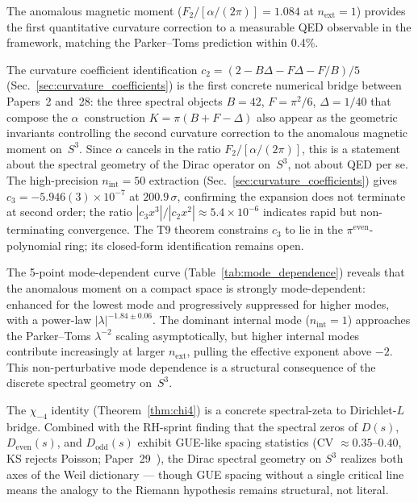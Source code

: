 \documentclass[11pt]{article}
\begin{document}
The anomalous
magnetic moment ($F_2 / [\alpha/(2\pi)] = 1.084$ at
$n_{\mathrm{ext}} = 1$) provides the first quantitative curvature
correction to a measurable QED observable in the framework, matching the
Parker--Toms prediction within 0.4\%.

The curvature coefficient identification
$c_2 = (2 - B\Delta - F\Delta - F/B)/5$
(Sec.~\ref{sec:curvature_coefficients}) is the first concrete
numerical bridge between Papers~2 and~28: the three spectral objects
$B = 42$, $F = \pi^2/6$, $\Delta = 1/40$ that compose the
$\alpha$~construction $K = \pi(B + F - \Delta)$ also appear as the
geometric invariants controlling the second curvature correction to the
anomalous magnetic moment on~$S^3$.  Since $\alpha$ cancels in the ratio
$F_2/[\alpha/(2\pi)]$, this is a statement about the spectral geometry
of the Dirac operator on~$S^3$, not about QED per se.  The high-precision
$n_{\mathrm{int}}=50$ extraction (Sec.~\ref{sec:curvature_coefficients})
gives $c_3 = -5.946(3) \times 10^{-7}$ at $200.9\,\sigma$, confirming the
expansion does not terminate at second order; the ratio
$|c_3 x^3| / |c_2 x^2| \approx 5.4 \times 10^{-6}$ indicates rapid but
non-terminating convergence.  The T9 theorem constrains $c_3$ to lie in
the $\pi^{\mathrm{even}}$-polynomial ring; its closed-form identification
remains open.

The 5-point mode-dependent curve
(Table~\ref{tab:mode_dependence}) reveals that the anomalous moment on
a compact space is strongly mode-dependent: enhanced for the lowest mode
and progressively suppressed for higher modes, with a power-law
$|\lambda|^{-1.84 \pm 0.06}$.  The dominant internal mode ($n_{\mathrm{int}} = 1$)
approaches the Parker--Toms $\lambda^{-2}$ scaling asymptotically, but
higher internal modes contribute increasingly at larger $n_{\mathrm{ext}}$,
pulling the effective exponent above $-2$.  This non-perturbative mode
dependence is a structural consequence of the discrete spectral
geometry on~$S^3$.

The $\chi_{-4}$ identity (Theorem~\ref{thm:chi4}) is a concrete
spectral-zeta to Dirichlet-$L$ bridge.  Combined with the RH-sprint
finding that the spectral zeros of $D(s)$, $D_{\mathrm{even}}(s)$, and
$D_{\mathrm{odd}}(s)$ exhibit GUE-like spacing statistics (CV $\approx
0.35$--$0.40$, KS rejects Poisson; Paper~29~\cite{paper29}), the
Dirac spectral geometry on $S^3$ realizes both axes of the Weil
dictionary --- though GUE spacing without a single critical line means
the analogy to the Riemann hypothesis remains structural, not literal.
\end{document}
